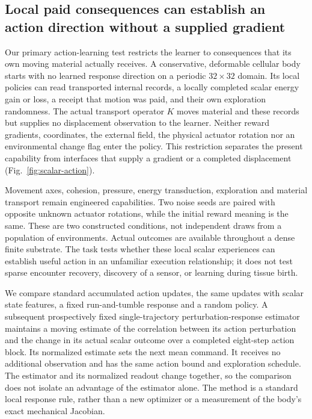\subsection*{Local paid consequences can establish an action direction without a supplied gradient}

Our primary action-learning test restricts the learner to consequences that its own moving material actually receives. A conservative, deformable cellular body starts with no learned response direction on a periodic $32\times32$ domain. Its local policies can read transported internal records, a locally completed scalar energy gain or loss, a receipt that motion was paid, and their own exploration randomness. The actual transport operator $K$ moves material and these records but supplies no displacement observation to the learner. Neither reward gradients, coordinates, the external field, the physical actuator rotation nor an environmental change flag enter the policy. This restriction separates the present capability from interfaces that supply a gradient or a completed displacement (Fig.~\ref{fig:scalar-action}).

Movement axes, cohesion, pressure, energy transduction, exploration and material transport remain engineered capabilities. Two noise seeds are paired with opposite unknown actuator rotations, while the initial reward meaning is the same. These are two constructed conditions, not independent draws from a population of environments. Actual outcomes are available throughout a dense finite substrate. The task tests whether these local scalar experiences can establish useful action in an unfamiliar execution relationship; it does not test sparse encounter recovery, discovery of a sensor, or learning during tissue birth.

We compare standard accumulated action updates, the same updates with scalar state features, a fixed run-and-tumble response and a random policy. A subsequent prospectively fixed single-trajectory perturbation-response estimator maintains a moving estimate of the correlation between its action perturbation and the change in its actual scalar outcome over a completed eight-step action block. Its normalized estimate sets the next mean command. It receives no additional observation and has the same action bound and exploration schedule. The estimator and its normalized readout change together, so the comparison does not isolate an advantage of the estimator alone. The method is a standard local response rule, rather than a new optimizer or a measurement of the body's exact mechanical Jacobian.

